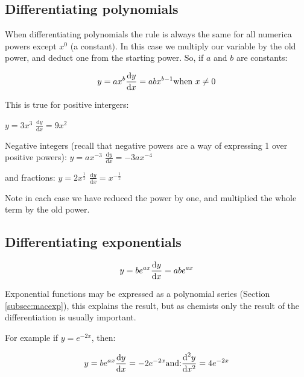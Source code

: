 \documentclass[
]{book}
\begin{document}
\hypertarget{subsec:diffpolynomial}{%
\subsection{Differentiating polynomials}\label{subsec:diffpolynomial}}

When differentiating polynomials the rule is always the same for all numerica powers except \(x^0\) (a constant). In this case we multiply our variable by the old power, and deduct one from the starting power. So, if \(a\) and \(b\) are constants:

\begin{equation}
y = ax^b\\
\frac{\textrm{d}y}{\textrm{d}x}=abx^{b-1}\\
\textrm{when } x \neq 0
\label{eq:diffpoly}
\end{equation}

This is true for positive intergers:

\(y = 3x^3\)
\(\frac{\textrm{d}y}{\textrm{d}x} = 9x^2\)

Negative integers (recall that negative powers are a way of expressing 1 over positive powers):
\(y = ax^{-3}\)
\(\frac{\textrm{d}y}{\textrm{d}x} = -3ax^{-4}\)

and fractions:
\(y = 2x^{\frac{1}{2}}\)
\(\frac{\textrm{d}y}{\textrm{d}x} = x^{-\frac{1}{2}}\)

Note in each case we have reduced the power by one, and multiplied the whole term by the old power.

\hypertarget{subsec:diffexp}{%
\subsection{Differentiating exponentials}\label{subsec:diffexp}}

\begin{equation}
y = be^{ax}\\
\frac{\textrm{d}y}{\textrm{d}x}=abe^{ax}
\label{eq:diffexp}
\end{equation}

Exponential functions may be expressed as a polynomial series (Section \ref{subsec:macexp}), this explains the result, but as chemists only the result of the differentiation is usually important.

For example if \(y=e^{-2x}\), then:

\begin{equation*}
y = be^{ax}\\
\frac{\textrm{d}y}{\textrm{d}x}=-2e^{-2x}\\
\textrm{and:}\\
\frac{\textrm{d}^2y}{\textrm{d}x^2}=4e^{-2x}
\end{equation*}
\end{document}

